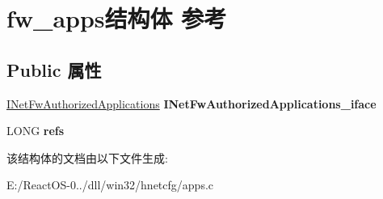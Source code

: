 \hypertarget{structfw__apps}{}\section{fw\+\_\+apps结构体 参考}
\label{structfw__apps}
\subsection*{Public 属性}
\begin{DoxyCompactItemize}
\item 
\mbox{\label{structfw__apps_aa4f8a6aac4abbd997de3a3f5241b7384}} 
\hyperlink{interface_i_net_fw_authorized_applications}{I\+Net\+Fw\+Authorized\+Applications} {\bfseries I\+Net\+Fw\+Authorized\+Applications\+\_\+iface}
\item 
\mbox{\label{structfw__apps_a1d96a2900e339fd9adef04781c7ec282}} 
L\+O\+NG {\bfseries refs}
\end{DoxyCompactItemize}


该结构体的文档由以下文件生成\+:\begin{DoxyCompactItemize}
\item 
E\+:/\+React\+O\+S-\/0../dll/win32/hnetcfg/apps.\+c\end{DoxyCompactItemize}
